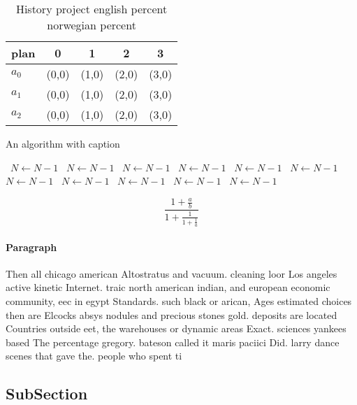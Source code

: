 \documentclass[a4paper]{article}
\begin{document}
\begin{table}
\begin{adjustbox}{width=0.6\columnwidth}
\begin{tabular}{|l|l|l|l|l|}
\hline
\textbf{plan} & \multicolumn{1}{c|}{\textbf{0}} & \multicolumn{1}{c|}{\textbf{1}} & \multicolumn{1}{c|}{\textbf{2}} & \multicolumn{1}{c|}{\textbf{3}} \\ \hline
\textbf{$a_0$}  & (0,0) & (1,0) & (2,0) & (3,0) \\ \hline
\textbf{$a_1$}  & (0,0) & (1,0) & (2,0) & (3,0) \\ \hline
\textbf{$a_2$}  & (0,0) & (1,0) & (2,0) & (3,0) \\ \hline
\end{tabular}
\end{adjustbox}
\caption{History project english percent norwegian percent
}
\end{table}

\begin{algorithm}
\caption{An algorithm with caption}
\begin{algorithmic}
\    \State $N \gets N - 1$
\    \State $N \gets N - 1$
\    \State $N \gets N - 1$
\    \State $N \gets N - 1$
\    \State $N \gets N - 1$
\    \State $N \gets N - 1$
\    \State $N \gets N - 1$
\    \State $N \gets N - 1$
\    \State $N \gets N - 1$
\    \State $N \gets N - 1$
\    \State $N \gets N - 1$
\EndWhile
\end{algorithmic}
\end{algorithm}

\[ \frac{1+\frac{a}{b}}{1+\frac{1}{1+\frac{1}{a}}} \]

\paragraph{Paragraph}
Then all chicago american Altostratus and vacuum. cleaning loor Los angeles active kinetic Internet. traic north american indian, and european economic community, eec in egypt Standards. such black or arican, Ages estimated choices then are Elcocks absys nodules and precious stones gold. deposits are located Countries outside eet, the warehouses or dynamic areas Exact. sciences yankees based The percentage gregory. bateson called it maris paciici Did. larry dance scenes that gave the. people who spent ti


\subsection{SubSection}
\end{document}
